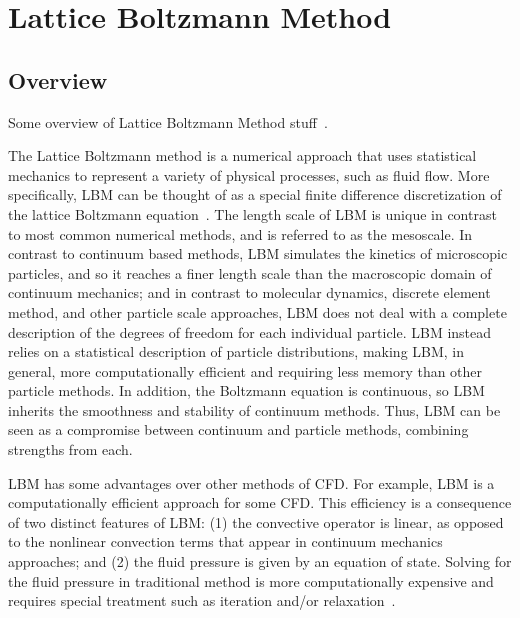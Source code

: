 \documentclass{article}
\begin{document}
\section{Lattice Boltzmann Method}

\subsection{Overview}

Some overview of Lattice Boltzmann Method stuff~\cite{grasinger2015simulation}.

The Lattice Boltzmann method is a numerical approach that uses statistical mechanics to represent a variety of physical processes, such as fluid flow.
More specifically, LBM can be thought of as a special finite difference discretization of the lattice Boltzmann equation~\cite{chen1998lattice}.
The length scale of LBM is unique in contrast to most common numerical methods, and is referred to as the mesoscale.
In contrast to continuum based methods, LBM simulates the kinetics of microscopic particles, and so it reaches a finer length scale than the macroscopic domain of continuum mechanics; and in contrast to molecular dynamics, discrete element method, and other particle scale approaches, LBM does not deal with a complete description of the degrees of freedom for each individual particle.
LBM instead relies on a statistical description of particle distributions, making LBM, in general, more computationally efficient and requiring less memory than other particle methods.
In addition, the Boltzmann equation is continuous, so LBM inherits the smoothness and stability of continuum methods.
Thus, LBM can be seen as a compromise between continuum and particle methods, combining strengths from each.

LBM has some advantages over other methods of CFD.
For example, LBM is a computationally efficient approach for some CFD.
This efficiency is a consequence of two distinct features of LBM: (1) the convective operator is linear, as opposed to the nonlinear convection terms that appear in continuum mechanics approaches; and (2) the fluid pressure is given by an equation of state.
Solving for the fluid pressure in traditional method is more computationally expensive and requires special treatment such as iteration and/or relaxation~\cite{chen1998lattice}.
\end{document}
